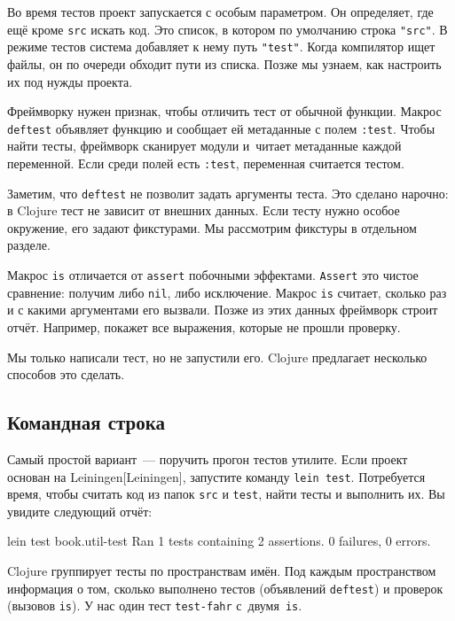 Во время тестов проект запускается с особым параметром. Он определяет, где ещё
кроме \verb|src| искать код. Это список, в котором по умолчанию строка
\verb|"src"|. В режиме тестов система добавляет к нему путь \verb|"test"|. Когда
компилятор ищет файлы, он по очереди обходит пути из списка. Позже мы узнаем,
как настроить их под нужды проекта.


Фреймворку нужен признак, чтобы отличить тест от обычной функции. Макрос
\verb|deftest| объявляет функцию и сообщает ей метаданные с полем
\verb|:test|. Чтобы найти тесты, фреймворк сканирует модули и~читает метаданные
каждой переменной. Если среди полей есть \verb|:test|, переменная считается
тестом.

Заметим, что \verb|deftest| не позволит задать аргументы теста. Это сделано
нарочно: в Clojure тест не зависит от внешних данных. Если тесту нужно особое
окружение, его задают фикстурами. Мы рассмотрим фикстуры в отдельном разделе.

Макрос \verb|is| отличается от \verb|assert| побочными
эффектами. \verb|Assert| это чистое сравнение: получим либо \verb|nil|, либо
исключение. Макрос \verb|is| считает, сколько раз и с какими аргументами его
вызвали. Позже из этих данных фреймворк строит отчёт. Например, покажет все
выражения, которые не прошли проверку.

Мы только написали тест, но не запустили его. Clojure предлагает несколько
способов это сделать.

\subsection{Командная строка}


Самый простой вариант~--- поручить прогон тестов утилите. Если проект основан на
Leiningen[Leiningen], запустите команду \verb|lein test|.
Потребуется время, чтобы считать код из папок \verb|src| и \verb|test|,
найти тесты и выполнить их. Вы увидите следующий отчёт:

\begin{english}
  \begin{text}
lein test book.util-test
Ran 1 tests containing 2 assertions.
0 failures, 0 errors.
  \end{text}
\end{english}

Clojure группирует тесты по пространствам имён. Под каждым пространством
информация о том, сколько выполнено тестов (объявлений \verb|deftest|) и
проверок (вызовов \verb|is|). У нас один тест \verb|test-fahr| с~двумя~\verb|is|.

